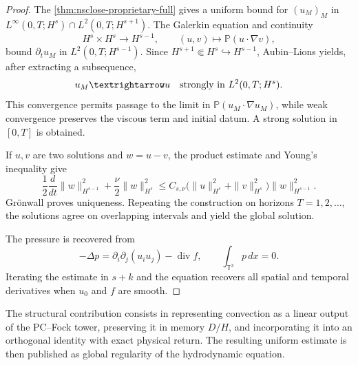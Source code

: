 \begin{proof}
The \cref{thm:nsclose-proprietary-full} gives a uniform bound for \((u_M)_M\) in \(L^\infty(0,T;H^s)\cap L^2(0,T;H^{s+1})\). The Galerkin equation and continuity
\[
 H^s\times H^s\longrightarrow H^{s-1},
 \qquad (u,v)\longmapsto\mathbb P(u\cdot\nabla v),
\]
bound \(\partial_tu_M\) in \(L^2(0,T;H^{s-1})\). Since \(H^{s+1}\Subset H^s\hookrightarrow H^{s-1}\), Aubin--Lions yields, after extracting a subsequence,
\[
 u_M\longrightarrow u\quad\hbox{strongly in }L^2(0,T;H^s).
\]
This convergence permits passage to the limit in \(\mathbb P(u_M\cdot\nabla u_M)\), while weak convergence preserves the viscous term and initial datum. A strong solution in \([0,T]\) is obtained.

If \(u,v\) are two solutions and \(w=u-v\), the product estimate and Young's inequality give
\[
 \frac12\frac d{dt}\|w\|_{H^{s-1}}^2
 +\frac\nu2\|w\|_{H^s}^2
 \le C_{s,\nu}\bigl(\|u\|_{H^s}^2+\|v\|_{H^s}^2\bigr)
 \|w\|_{H^{s-1}}^2.
\]
Grönwall proves uniqueness. Repeating the construction on horizons \(T=1,2,\ldots\), the solutions agree on overlapping intervals and yield the global solution.

The pressure is recovered from
\begin{equation}
 -\Delta p=\partial_i\partial_j(u_i u_j)-\operatorname{div}f,
 \qquad \int_{\mathbb T^3}p\,dx=0.
 \label{eq:nsclose-pressure-recovery}
\end{equation}
Iterating the estimate in \(s+k\) and the equation recovers all spatial and temporal derivatives when \(u_0\) and \(f\) are smooth.
\end{proof}

The structural contribution consists in representing convection as a linear output of the PC--Fock tower, preserving it in memory \(D/H\), and incorporating it into an orthogonal identity with exact physical return. The resulting uniform estimate is then published as global regularity of the hydrodynamic equation.
